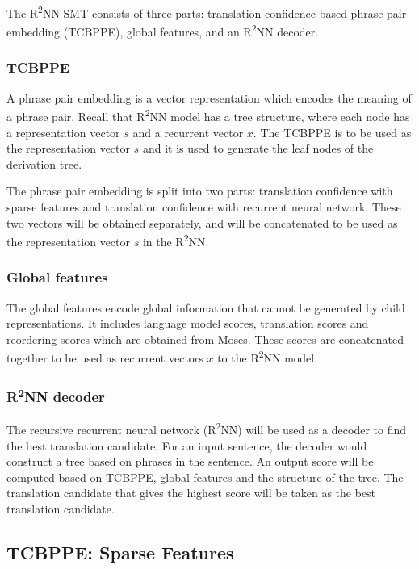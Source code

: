 \documentclass[12pt,a4paper,twoside,openright]{report}
\begin{document}
The R\textsuperscript{2}NN SMT consists of three parts: translation confidence based phrase pair embedding (TCBPPE), global features, and an R\textsuperscript{2}NN decoder.

\subsubsection{TCBPPE}
A phrase pair embedding is a vector representation which encodes the meaning of a phrase pair. Recall that R\textsuperscript{2}NN model has a tree structure, where each node has a representation vector $s$ and a recurrent vector $x$. The TCBPPE is to be used as the representation vector $s$ and it is used to generate the leaf nodes of the derivation tree. 

The phrase pair embedding is split into two parts: translation confidence with sparse features and translation confidence with recurrent neural network. These two vectors will be obtained separately, and will be concatenated to be used as the representation vector $s$ in the R\textsuperscript{2}NN.

\subsubsection{Global features}
The global features encode global information that cannot be generated by child representations. It includes language model scores, translation scores and reordering scores which are obtained from Moses. These scores are concatenated together to be used as recurrent vectors $x$ to the R\textsuperscript{2}NN model.

\subsubsection{R\textsuperscript{2}NN decoder}
The recursive recurrent neural network (R\textsuperscript{2}NN) will be used as a decoder to find the best translation candidate. For an input sentence, the decoder would construct a tree based on phrases in the sentence. An output score will be computed based on TCBPPE, global features and the structure of the tree. The translation candidate that gives the highest score will be taken as the best translation candidate.

\subsection{TCBPPE: Sparse Features} \label{section:TCBPPE_sparse}
\end{document}

